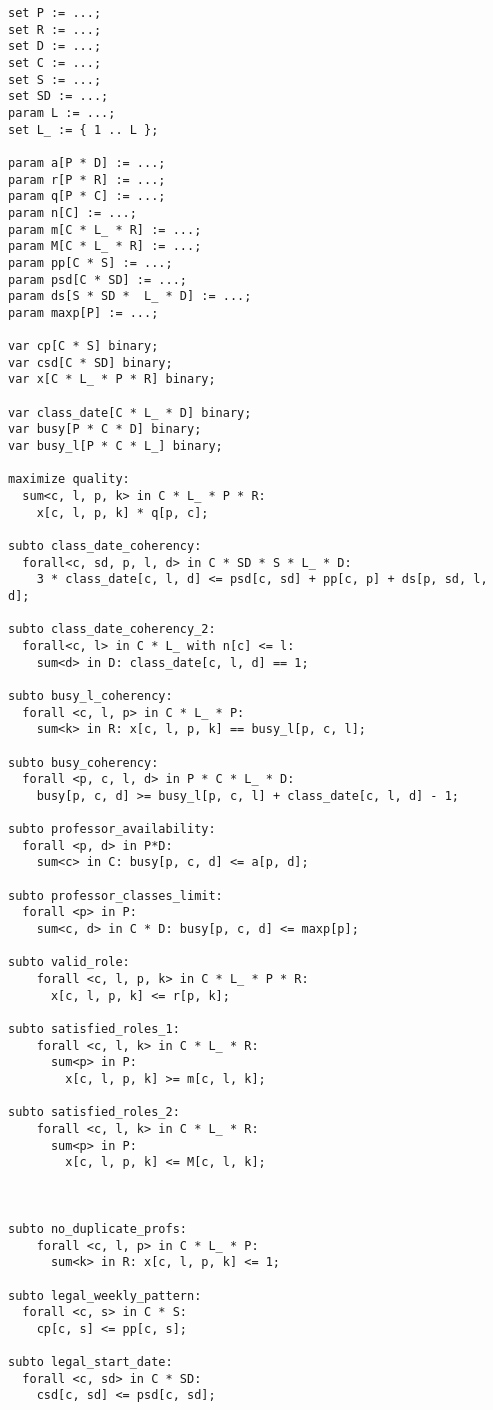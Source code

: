 \begin{verbatim}
set P := ...;
set R := ...;
set D := ...;
set C := ...;
set S := ...;
set SD := ...;
param L := ...;
set L_ := { 1 .. L };

param a[P * D] := ...;
param r[P * R] := ...;
param q[P * C] := ...;
param n[C] := ...;
param m[C * L_ * R] := ...;
param M[C * L_ * R] := ...;
param pp[C * S] := ...;
param psd[C * SD] := ...;
param ds[S * SD *  L_ * D] := ...;
param maxp[P] := ...;

var cp[C * S] binary;
var csd[C * SD] binary;
var x[C * L_ * P * R] binary;

var class_date[C * L_ * D] binary;
var busy[P * C * D] binary;
var busy_l[P * C * L_] binary;

maximize quality:
  sum<c, l, p, k> in C * L_ * P * R:
    x[c, l, p, k] * q[p, c];

subto class_date_coherency:
  forall<c, sd, p, l, d> in C * SD * S * L_ * D:
    3 * class_date[c, l, d] <= psd[c, sd] + pp[c, p] + ds[p, sd, l, d];

subto class_date_coherency_2:
  forall<c, l> in C * L_ with n[c] <= l:
    sum<d> in D: class_date[c, l, d] == 1;

subto busy_l_coherency:
  forall <c, l, p> in C * L_ * P:
    sum<k> in R: x[c, l, p, k] == busy_l[p, c, l];

subto busy_coherency:
  forall <p, c, l, d> in P * C * L_ * D:
    busy[p, c, d] >= busy_l[p, c, l] + class_date[c, l, d] - 1;

subto professor_availability:
  forall <p, d> in P*D:
    sum<c> in C: busy[p, c, d] <= a[p, d];

subto professor_classes_limit:
  forall <p> in P:
    sum<c, d> in C * D: busy[p, c, d] <= maxp[p];

subto valid_role:
    forall <c, l, p, k> in C * L_ * P * R:
      x[c, l, p, k] <= r[p, k];

subto satisfied_roles_1:
    forall <c, l, k> in C * L_ * R:
      sum<p> in P:
        x[c, l, p, k] >= m[c, l, k];

subto satisfied_roles_2:
    forall <c, l, k> in C * L_ * R:
      sum<p> in P:
        x[c, l, p, k] <= M[c, l, k];



subto no_duplicate_profs:
    forall <c, l, p> in C * L_ * P:
      sum<k> in R: x[c, l, p, k] <= 1;

subto legal_weekly_pattern:
  forall <c, s> in C * S:
    cp[c, s] <= pp[c, s];

subto legal_start_date:
  forall <c, sd> in C * SD:
    csd[c, sd] <= psd[c, sd];
\end{verbatim}
